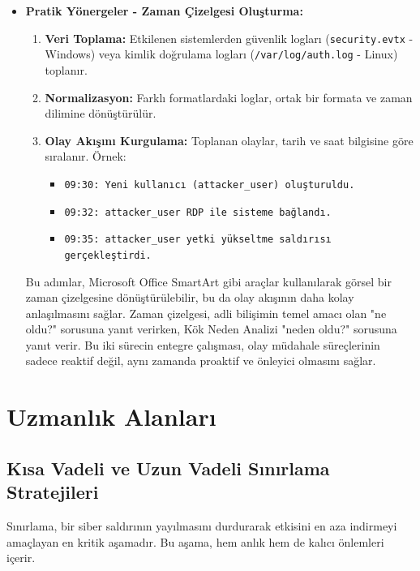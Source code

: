 \begin{itemize}
\begin{itemize}
\begin{itemize}
    \item \textbf{Pratik Yönergeler - Zaman Çizelgesi Oluşturma:}
    \begin{enumerate}
        \item \textbf{Veri Toplama:} Etkilenen sistemlerden güvenlik logları (\texttt{security.evtx} - Windows) veya kimlik doğrulama logları (\texttt{/var/log/auth.log} - Linux) toplanır.
        \item \textbf{Normalizasyon:} Farklı formatlardaki loglar, ortak bir formata ve zaman dilimine dönüştürülür.
        \item \textbf{Olay Akışını Kurgulama:} Toplanan olaylar, tarih ve saat bilgisine göre sıralanır. Örnek:
        \begin{itemize}
            \item \texttt{09:30: Yeni kullanıcı (attacker\_user) oluşturuldu.}
            \item \texttt{09:32: attacker\_user RDP ile sisteme bağlandı.}
            \item \texttt{09:35: attacker\_user yetki yükseltme saldırısı gerçekleştirdi.}
        \end{itemize}
    \end{enumerate}
    Bu adımlar, Microsoft Office SmartArt gibi araçlar kullanılarak görsel bir zaman çizelgesine dönüştürülebilir, bu da olay akışının daha kolay anlaşılmasını sağlar. Zaman çizelgesi, adli bilişimin temel amacı olan "ne oldu?" sorusuna yanıt verirken, Kök Neden Analizi "neden oldu?" sorusuna yanıt verir. Bu iki sürecin entegre çalışması, olay müdahale süreçlerinin sadece reaktif değil, aynı zamanda proaktif ve önleyici olmasını sağlar.
\end{itemize}

\section{Uzmanlık Alanları}

\subsection{Kısa Vadeli ve Uzun Vadeli Sınırlama Stratejileri}

Sınırlama, bir siber saldırının yayılmasını durdurarak etkisini en aza indirmeyi amaçlayan en kritik aşamadır. Bu aşama, hem anlık hem de kalıcı önlemleri içerir.


\end{itemize}
\end{itemize}
